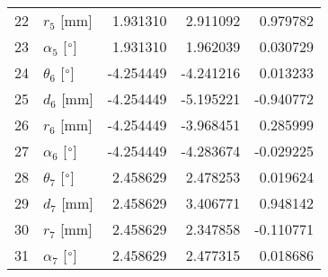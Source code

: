 \documentclass{standalone}%
\begin{document}
\begin{tabular}{llrrr}
22 &              $r_{5}$ [mm] &  1.931310 &   2.911092 &   0.979782 \\
23 &  $\alpha_{5}$ [$\degree$] &  1.931310 &   1.962039 &   0.030729 \\
24 &  $\theta_{6}$ [$\degree$] & -4.254449 &  -4.241216 &   0.013233 \\
25 &              $d_{6}$ [mm] & -4.254449 &  -5.195221 &  -0.940772 \\
26 &              $r_{6}$ [mm] & -4.254449 &  -3.968451 &   0.285999 \\
27 &  $\alpha_{6}$ [$\degree$] & -4.254449 &  -4.283674 &  -0.029225 \\
28 &  $\theta_{7}$ [$\degree$] &  2.458629 &   2.478253 &   0.019624 \\
29 &              $d_{7}$ [mm] &  2.458629 &   3.406771 &   0.948142 \\
30 &              $r_{7}$ [mm] &  2.458629 &   2.347858 &  -0.110771 \\
31 &  $\alpha_{7}$ [$\degree$] &  2.458629 &   2.477315 &   0.018686 \\
\bottomrule
\end{tabular}
%
\end{document}

